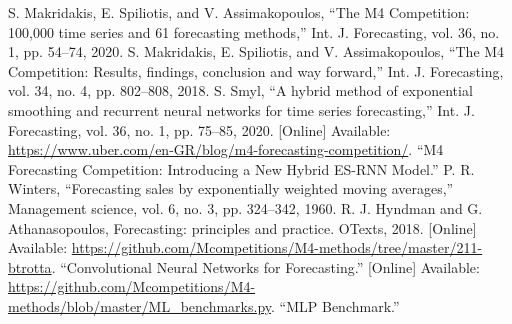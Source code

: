 \documentclass[conference]{IEEEtran}
\begin{document}
\begin{thebibliography}{00}
 S. Makridakis, E. Spiliotis, and V. Assimakopoulos, ``The M4 Competition: 100,000 time series and 61 forecasting methods,'' Int. J. Forecasting, vol. 36, no. 1, pp. 54--74, 2020.
 S. Makridakis, E. Spiliotis, and V. Assimakopoulos, ``The M4 Competition: Results, findings, conclusion and way forward,'' Int. J. Forecasting, vol. 34, no. 4, pp. 802--808, 2018.
 S. Smyl, ``A hybrid method of exponential smoothing and recurrent neural networks for time series forecasting,'' Int. J. Forecasting, vol. 36, no. 1, pp. 75--85, 2020.
 [Online] Available: \url{https://www.uber.com/en-GR/blog/m4-forecasting-competition/}. ``M4 Forecasting Competition: Introducing a New Hybrid ES-RNN Model.''
 P. R. Winters, ``Forecasting sales by exponentially weighted moving averages,'' Management science, vol. 6, no. 3, pp. 324--342, 1960.
 R. J. Hyndman and G. Athanasopoulos, Forecasting: principles and practice. OTexts, 2018.
 [Online] Available: \url{https://github.com/Mcompetitions/M4-methods/tree/master/211-btrotta}. ``Convolutional Neural Networks for Forecasting.''
 [Online] Available: \url{https://github.com/Mcompetitions/M4-methods/blob/master/ML_benchmarks.py}. ``MLP Benchmark.''
\end{thebibliography}
\end{document}

